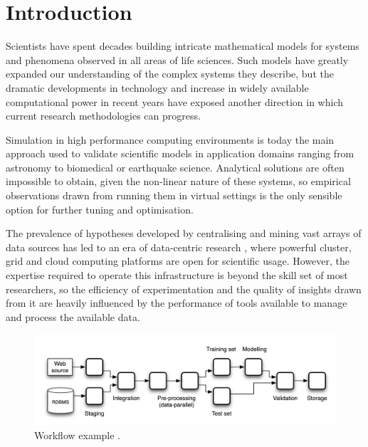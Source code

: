 \documentclass[11pt,a4paper]{report}
\begin{document}


\hypersetup{allcolors=black}
\tableofcontents
\newpage

\chapter{Introduction}

Scientists have spent decades building intricate mathematical models for systems and phenomena observed in all areas of life sciences. Such models have greatly expanded our understanding of the complex systems they describe, but the dramatic developments in technology and increase in widely available computational power in recent years have exposed another direction in which current research methodologies can progress.

Simulation in high performance computing environments is today the main approach used to validate scientific models in application domains ranging from astronomy to biomedical or earthquake science. Analytical solutions are often impossible to obtain, given the non-linear nature of these systems, so empirical observations drawn from running them in virtual settings is the only sensible option for further tuning and optimisation.

The prevalence of hypotheses developed by centralising and mining vast arrays of data sources has led to an era of data-centric research \cite{Goble2009}, where powerful cluster, grid and cloud computing platforms are open for scientific usage. However, the expertise required to operate this infrastructure is beyond the skill set of most researchers, so the efficiency of experimentation and the quality of insights drawn from it are heavily influenced by the performance of tools available to manage and process the available data.

\begin{figure}[h]
	\centering
		\includegraphics[scale=0.22]{figures/WorkflowExample.png}
	\caption{Workflow example \cite{Curcin2008}.}
	\label{WorkflowExample}
\end{figure}
\end{document}
